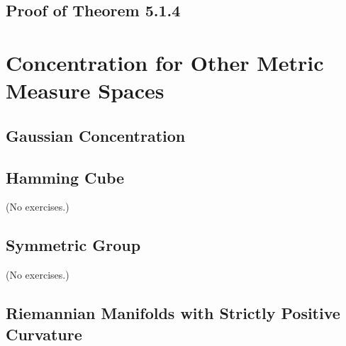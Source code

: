 \documentclass{report}
\theoremstyle{definition}
\newenvironment{exercise}[1]{
  \renewcommand\theexerciseimpl{#1}
  \exerciseimpl
}{\endexerciseimpl}
\begin{document}
\begin{exercise}{5.1.9}
\end{exercise}

\subsection{Proof of Theorem 5.1.4}

\begin{exercise}{5.1.11}
\end{exercise}

\begin{exercise}{5.1.12}
\end{exercise}

\begin{exercise}{5.1.13}
\end{exercise}

\begin{exercise}{5.1.14}
\end{exercise}

\begin{exercise}{5.1.15}
\end{exercise}

\section{Concentration for Other Metric Measure Spaces}

\subsection{Gaussian Concentration}

\begin{exercise}{5.2.3}
\end{exercise}

\begin{exercise}{5.2.4}
\end{exercise}

\subsection{Hamming Cube}

(No exercises.)

\subsection{Symmetric Group}

(No exercises.)

\subsection{Riemannian Manifolds with Strictly Positive Curvature}
\end{document}
